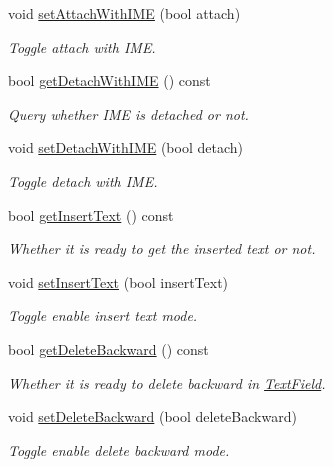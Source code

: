 \begin{DoxyCompactItemize}
void \hyperlink{classui_1_1TextField_a987520fa2d96e9326a628bc1f9521605}{set\+Attach\+With\+I\+ME} (bool attach)
\begin{DoxyCompactList}\small\item\em Toggle attach with I\+ME. \end{DoxyCompactList}\item 
bool \hyperlink{classui_1_1TextField_a93e9883ab554e898380cc643a962126e}{get\+Detach\+With\+I\+ME} () const
\begin{DoxyCompactList}\small\item\em Query whether I\+ME is detached or not. \end{DoxyCompactList}\item 
void \hyperlink{classui_1_1TextField_accfce2b8fdc0f2ae95e3f07dabd9f292}{set\+Detach\+With\+I\+ME} (bool detach)
\begin{DoxyCompactList}\small\item\em Toggle detach with I\+ME. \end{DoxyCompactList}\item 
bool \hyperlink{classui_1_1TextField_a627e0f88f89ac842204f48b5fc530518}{get\+Insert\+Text} () const
\begin{DoxyCompactList}\small\item\em Whether it is ready to get the inserted text or not. \end{DoxyCompactList}\item 
void \hyperlink{classui_1_1TextField_a87a947d81dffe504e2a1abd0712d7efc}{set\+Insert\+Text} (bool insert\+Text)
\begin{DoxyCompactList}\small\item\em Toggle enable insert text mode. \end{DoxyCompactList}\item 
bool \hyperlink{classui_1_1TextField_ace67fc7cdbc68d981ab918e86d0d462c}{get\+Delete\+Backward} () const
\begin{DoxyCompactList}\small\item\em Whether it is ready to delete backward in \hyperlink{classui_1_1TextField}{Text\+Field}. \end{DoxyCompactList}\item 
void \hyperlink{classui_1_1TextField_af82f6143c7a6554e654a73527bf7e83e}{set\+Delete\+Backward} (bool delete\+Backward)
\begin{DoxyCompactList}\small\item\em Toggle enable delete backward mode. \end{DoxyCompactList}\item 

\end{DoxyCompactItemize}
